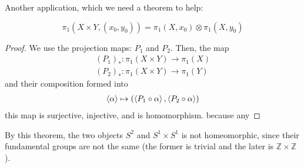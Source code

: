 Another application, which we need a theorem to help:
\begin{thm}
    \begin{equation}
        \pi_1 (X\times Y, (x_0,y_0)) = \pi_1 (X,x_0) \otimes \pi_1
        (X,y_0)
    \end{equation}
\end{thm}
\begin{proof}
    We use the projection maps: $P_1$ and $P_2$.
    Then, the map
    \begin{align*}
        (P_1)_*: \pi_1 (X\times Y) \to \pi_1(X) \\
        (P_2)_*: \pi_1 (X\times Y) \to \pi_1(Y)
    \end{align*}
    and their composition formed into
    \begin{align*}
        \braket{\alpha}\mapsto
        (\braket{P_1\circ\alpha},\braket{P_2\circ\alpha})
    \end{align*}
    this map is surjective, injective, and is homomorphism.
    because any %
\end{proof}

\begin{fact}
By this theorem, the two objects $S^2$ and $S^1\times S^1$ is not
homeomorphic, since their fundamental groups are not the same (the
former is trivial and the later is $\mathbb{Z}\times\mathbb{Z}$).
\end{fact}




